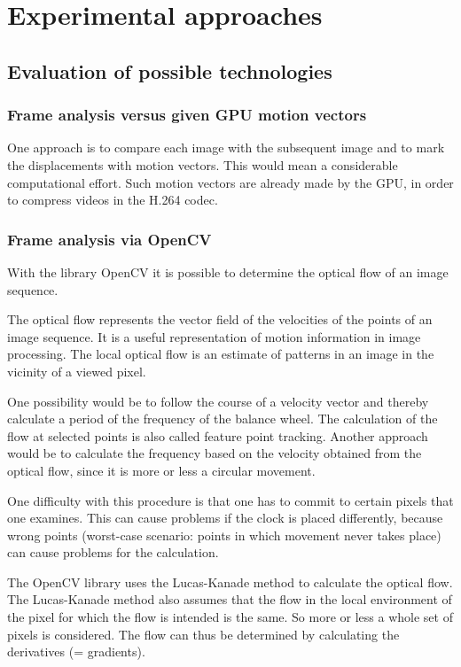 \documentclass[12pt, a4paper]{report}
\begin{document}
    
    \chapter {Experimental approaches}
    
    \section {Evaluation of possible technologies}
    \subsection{Frame analysis versus given GPU motion vectors}
    One approach is to compare each image with the subsequent image and to mark the displacements with motion vectors. This would mean a considerable computational effort.
    Such motion vectors are already made by the GPU, in order to compress videos in the H.264 codec.
    
    \subsection{Frame analysis via OpenCV}
    With the library OpenCV it is possible to determine the optical flow of an image sequence. 
    
    The optical flow represents the vector field of the velocities of the points of an image sequence. It is a useful representation of motion information in image processing. The local optical flow is an estimate of patterns in an image in the vicinity of a viewed pixel. 
    
    One possibility would be to follow the course of a velocity vector and thereby calculate a period of the frequency of the balance wheel. The calculation of the flow at selected points is also called feature point tracking. Another approach would be to calculate the frequency based on the velocity obtained from the optical flow, since it is more or less a circular movement. 
    
    One difficulty with this procedure is that one has to commit to certain pixels that one examines. This can cause problems if the clock is placed differently, because wrong points (worst-case scenario: points in which movement never takes place) can cause problems for the calculation.  
    
    The OpenCV library uses the Lucas-Kanade method to calculate the optical flow. The Lucas-Kanade method also assumes that the flow in the local environment of the pixel for which the flow is intended is the same. So more or less a whole set of pixels is considered. The flow can thus be determined by calculating the derivatives (= gradients). 
    
\end{document}
